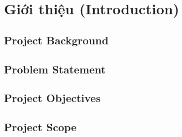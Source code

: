 \section{Giới thiệu (Introduction)}

\subsection{Project Background}

\subsection{Problem Statement}

\subsection{Project Objectives}

\subsection{Project Scope}
